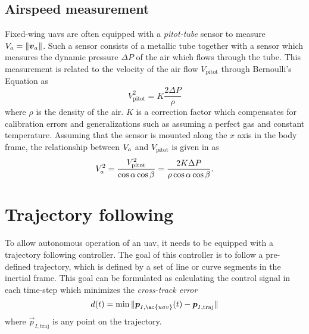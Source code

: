 \subsection{Airspeed measurement}\label{sec:measure_airspd}
Fixed-wing \acp{uav} are often equipped with a \textit{pitot-tube} sensor to measure $V_a=\|\boldsymbol{v}_a\|$.
Such a sensor consists of a metallic tube together with a sensor which measures the dynamic pressure $\Delta P$ of 
the air which flows through the tube. This measurement is related to the velocity of the air flow $V_{\text{pitot}}$ through 
Bernoulli's Equation as 
\begin{equation}
    V^2_{\text{pitot}} = K\frac{2\Delta P}{\rho}
\end{equation}
where $\rho$ is the density of the air. $K$ is a correction factor which compensates for calibration errors and 
generalizations such as assuming a perfect gas and constant temperature. Assuming that the sensor is mounted 
along the $x$ axis in the body frame, the relationship between $V_a$ and $V_{\text{pitot}}$ is given in \cite{pitot} as
\begin{equation}
    V_a^2=\frac{V^2_{\text{pitot}}}{\cos\alpha\cos\beta}=\frac{2K\Delta P}{\rho\cos\alpha\cos\beta}.
\end{equation}  

\section{Trajectory following}
To allow autonomous operation of an \ac{uav}, it needs to be equipped with a trajectory following controller.
The goal of this controller is to follow a pre-defined trajectory, which is defined by a set of 
line or curve segments in the inertial frame. This goal can be formulated as calculating the control signal 
in each time-step which minimizes the \textit{cross-track error}
\begin{equation}
    d(t)=\min\|\vec{p}_{I,\ac{uav}}(t)-\vec{p}_{I,\text{traj}}\|
\end{equation}
where $\vec{p}_{I,\text{traj}}$ is any point on the trajectory. 

